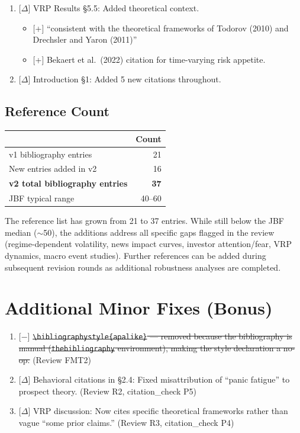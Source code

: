 \documentclass[12pt,a4paper]{article}
\newcommand{\added}[1]{\textcolor{addgreen}{[+] #1}}
\newcommand{\deleted}[1]{\textcolor{delred}{[$-$] \st{#1}}}
\newcommand{\modified}[1]{\textcolor{modblue}{[$\Delta$] #1}}
\begin{document}
\begin{enumerate}[leftmargin=*]
\item \modified{VRP Results \S5.5: Added theoretical context.}
\begin{itemize}
\item \added{``consistent with the theoretical frameworks of Todorov (2010) and Drechsler and Yaron (2011)''}
\item \added{Bekaert et al.\ (2022) citation for time-varying risk appetite.}
\end{itemize}

\item \modified{Introduction \S1: Added 5 new citations throughout.}

\end{enumerate}

\subsection*{Reference Count}

\begin{tabular}{lr}
\toprule
& Count \\
\midrule
v1 bibliography entries & 21 \\
New entries added in v2 & 16 \\
\textbf{v2 total bibliography entries} & \textbf{37} \\
JBF typical range & 40--60 \\
\bottomrule
\end{tabular}

\vspace{0.5em}
\noindent The reference list has grown from 21 to 37 entries. While still below the JBF median ($\sim$50), the additions address all specific gaps flagged in the review (regime-dependent volatility, news impact curves, investor attention/fear, VRP dynamics, macro event studies). Further references can be added during subsequent revision rounds as additional robustness analyses are completed.

\section*{Additional Minor Fixes (Bonus)}

\begin{enumerate}[leftmargin=*]
\item \deleted{\texttt{\textbackslash bibliographystyle\{apalike\}} --- removed because the bibliography is manual (\texttt{thebibliography} environment), making the style declaration a no-op.} (Review FMT2)
\item \modified{Behavioral citations in \S2.4: Fixed misattribution of ``panic fatigue'' to prospect theory.} (Review R2, citation\_check P5)
\item \modified{VRP discussion: Now cites specific theoretical frameworks rather than vague ``some prior claims.''} (Review R3, citation\_check P4)
\end{enumerate}
\end{document}
